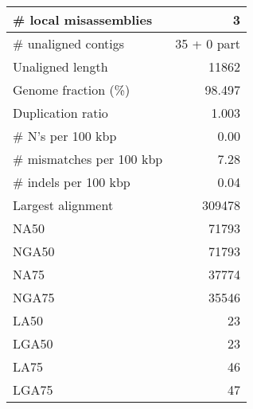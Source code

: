 \documentclass[12pt,a4paper]{article}
\begin{document}
\begin{table}[ht]
\begin{center}
\begin{tabular}{|l*{1}{|r}|}
\# local misassemblies & 3 \\ \hline
\# unaligned contigs & 35 + 0 part \\ \hline
Unaligned length & 11862 \\ \hline
Genome fraction (\%) & 98.497 \\ \hline
Duplication ratio & 1.003 \\ \hline
\# N's per 100 kbp & 0.00 \\ \hline
\# mismatches per 100 kbp & 7.28 \\ \hline
\# indels per 100 kbp & 0.04 \\ \hline
Largest alignment & 309478 \\ \hline
NA50 & 71793 \\ \hline
NGA50 & 71793 \\ \hline
NA75 & 37774 \\ \hline
NGA75 & 35546 \\ \hline
LA50 & 23 \\ \hline
LGA50 & 23 \\ \hline
LA75 & 46 \\ \hline
LGA75 & 47 \\ \hline
\end{tabular}
\end{center}
\end{table}
\end{document}
